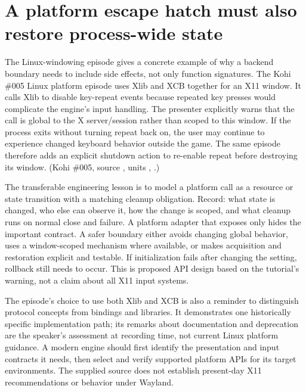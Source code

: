\section{A platform escape hatch must also restore process-wide state}\label{01-foundations-i-ch016-a-platform-escape-hatch-must-also-restore-process-wide-state}

\hypertarget{01-foundations-i-ch016-a-platform-escape-hatch-must-also-restore-process-wide-state}{}

The Linux-windowing episode gives a concrete example of why a backend boundary needs to include side effects, not only function signatures. The Kohi \#005 Linux platform episode uses Xlib and XCB together for an X11 window. It calls Xlib to disable key-repeat events because repeated key presses would complicate the engine's input handling. The presenter explicitly warns that the call is global to the X server/session rather than scoped to this window. If the process exits without turning repeat back on, the user may continue to experience changed keyboard behavior outside the game. The same episode therefore adds an explicit shutdown action to re-enable repeat before destroying its window. (Kohi \#005, source , units , .)

The transferable engineering lesson is to model a platform call as a resource or state transition with a matching cleanup obligation. Record: what state is changed, who else can observe it, how the change is scoped, and what cleanup runs on normal close and failure. A platform adapter that exposes only  hides the important contract. A safer boundary either avoids changing global behavior, uses a window-scoped mechanism where available, or makes acquisition and restoration explicit and testable. If initialization fails after changing the setting, rollback still needs to occur. This is proposed API design based on the tutorial's warning, not a claim about all X11 input systems.

The episode's choice to use both Xlib and XCB is also a reminder to distinguish protocol concepts from bindings and libraries. It demonstrates one historically specific implementation path; its remarks about documentation and deprecation are the speaker's assessment at recording time, not current Linux platform guidance. A modern engine should first identify the presentation and input contracts it needs, then select and verify supported platform APIs for its target environments. The supplied source does not establish present-day X11 recommendations or behavior under Wayland.

